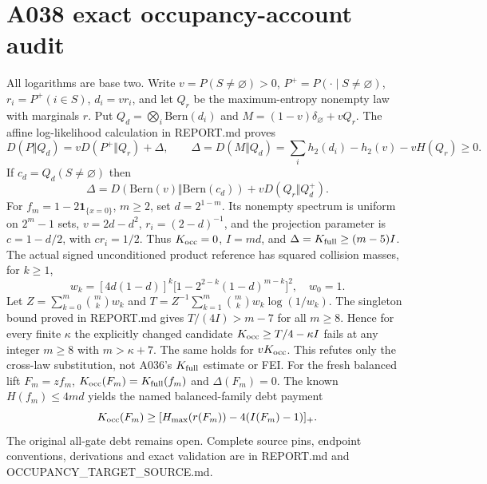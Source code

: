 \documentclass{article}
\begin{document}
\section*{A038 exact occupancy-account audit}
All logarithms are base two. Write $v=P(S\ne\varnothing)>0$, $P^+=P(\cdot\mid S\ne\varnothing)$, $r_i=P^+(i\in S)$, $d_i=vr_i$, and let $Q_r$ be the maximum-entropy nonempty law with marginals $r$. Put $Q_d=\bigotimes_i\mathrm{Bern}(d_i)$ and $M=(1-v)\delta_\varnothing+vQ_r$. The affine log-likelihood calculation in REPORT.md proves
\[
D(P\Vert Q_d)=vD(P^+\Vert Q_r)+\Delta,\qquad
\Delta=D(M\Vert Q_d)=\sum_i h_2(d_i)-h_2(v)-vH(Q_r)\ge0.
\]
If $c_d=Q_d(S\ne\varnothing)$ then
\[
\Delta=D(\mathrm{Bern}(v)\Vert\mathrm{Bern}(c_d))+vD(Q_r\Vert Q_d^+).
\]
For $f_m=1-2\mathbf1_{\{x=0\}}$, $m\ge2$, set $d=2^{1-m}$. Its nonempty spectrum is uniform on $2^m-1$ sets, $v=2d-d^2$, $r_i=(2-d)^{-1}$, and the projection parameter is $c=1-d/2$, with $cr_i=1/2$. Thus $K_{\rm occ}=0$, $I=md$, and $\Delta=K_{\rm full}\ge(m-5)I$.
The actual signed unconditioned product reference has squared collision masses, for $k\ge1$,
\[
w_k=[4d(1-d)]^k\bigl[1-2^{2-k}(1-d)^{m-k}\bigr]^2,\quad w_0=1.
\]
Let $Z=\sum_{k=0}^m\binom mk w_k$ and $T=Z^{-1}\sum_{k=1}^m\binom mk w_k\log(1/w_k)$. The singleton bound proved in REPORT.md gives $T/(4I)>m-7$ for all $m\ge8$. Hence for every finite $\kappa$ the explicitly changed candidate $K_{\rm occ}\ge T/4-\kappa I$ fails at any integer $m\ge8$ with $m>\kappa+7$. The same holds for $vK_{\rm occ}$. This refutes only the cross-law substitution, not A036's $K_{\rm full}$ estimate or FEI.
For the fresh balanced lift $F_m=z f_m$, $K_{\rm occ}(F_m)=K_{\rm full}(f_m)$ and $\Delta(F_m)=0$. The known $H(f_m)\le4md$ yields the named balanced-family debt payment
\[
K_{\rm occ}(F_m)\ge[H_{\max}(r(F_m))-4(I(F_m)-1)]_+.
\]
The original all-gate debt remains open. Complete source pins, endpoint conventions, derivations and exact validation are in REPORT.md and OCCUPANCY\_TARGET\_SOURCE.md.
\end{document}
